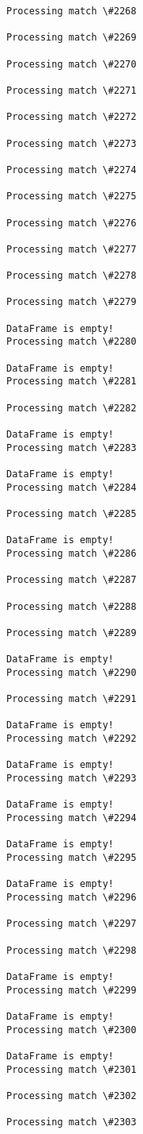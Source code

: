 \documentclass[11pt]{article}
\begin{document}
\begin{Verbatim}[commandchars=\\\{\}]
Processing match \#2268

Processing match \#2269

Processing match \#2270

Processing match \#2271

Processing match \#2272

Processing match \#2273

Processing match \#2274

Processing match \#2275

Processing match \#2276

Processing match \#2277

Processing match \#2278

Processing match \#2279

DataFrame is empty!
Processing match \#2280

DataFrame is empty!
Processing match \#2281

Processing match \#2282

DataFrame is empty!
Processing match \#2283

DataFrame is empty!
Processing match \#2284

Processing match \#2285

DataFrame is empty!
Processing match \#2286

Processing match \#2287

Processing match \#2288

Processing match \#2289

DataFrame is empty!
Processing match \#2290

Processing match \#2291

DataFrame is empty!
Processing match \#2292

DataFrame is empty!
Processing match \#2293

DataFrame is empty!
Processing match \#2294

DataFrame is empty!
Processing match \#2295

DataFrame is empty!
Processing match \#2296

Processing match \#2297

Processing match \#2298

DataFrame is empty!
Processing match \#2299

DataFrame is empty!
Processing match \#2300

DataFrame is empty!
Processing match \#2301

Processing match \#2302

Processing match \#2303


\end{Verbatim}
\end{document}
